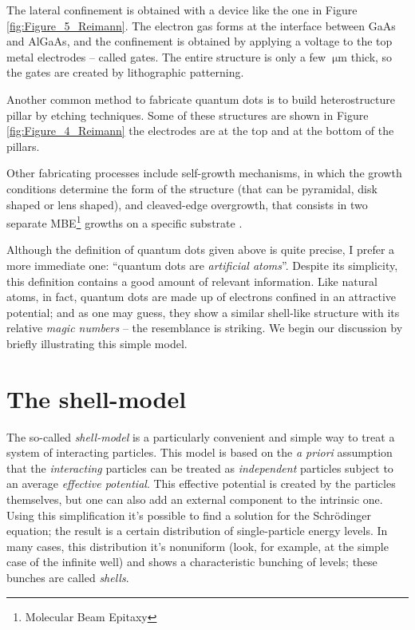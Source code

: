 \documentclass[a4paper,twoside,11pt]{book}
\begin{document}
The lateral confinement is obtained with a device like the one in Figure \ref{fig:Figure_5_Reimann}. The electron gas forms at the interface between GaAs and AlGaAs, and the confinement is obtained by applying a voltage to the top metal electrodes -- called gates. The entire structure is only a few $\SI{}{\micro\meter}$ thick, so the gates are created by lithographic patterning.

Another common method to fabricate quantum dots is to build heterostructure pillar by etching techniques. Some of these structures are shown in Figure \ref{fig:Figure_4_Reimann} the electrodes are at the top and at the bottom of the pillars.

Other fabricating processes include self-growth mechanisms, in which the growth conditions determine the form of the structure (that can be pyramidal, disk shaped or lens shaped), and cleaved-edge overgrowth, that consists in two separate MBE\footnote{Molecular Beam Epitaxy} growths on a specific substrate \citep[see][]{Reimann2002}.

Although the definition of quantum dots given above is quite precise, I prefer a more immediate one: ``quantum dots are \emph{artificial atoms}''. Despite its simplicity, this definition contains a good amount of relevant information. Like natural atoms, in fact, quantum dots are made up of electrons confined in an attractive potential; and as one may guess, they show a similar shell-like structure with its relative \emph{magic numbers} -- the resemblance is striking. We begin our discussion by briefly illustrating this simple model.

\section{The shell-model}
\label{sec:shell_model}
The so-called \emph{shell-model} is a particularly convenient and simple way to treat a system of interacting particles. This model is based on the \emph{a priori} assumption that the \emph{interacting} particles can be treated as \emph{independent} particles subject to an average \emph{effective potential}. This effective potential is created by the particles themselves, but one can also add an external component to the intrinsic one. Using this simplification it's possible to find a solution for the Schr\"{o}dinger equation; the result is a certain distribution of single-particle energy levels. In many cases, this distribution it's nonuniform (look, for example, at the simple case of the infinite well) and shows a characteristic bunching of levels; these bunches are called \emph{shells}.
\end{document}
